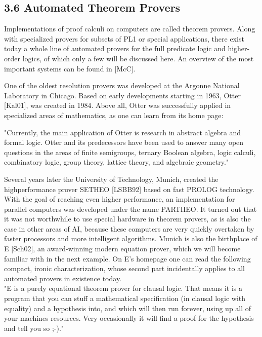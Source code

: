 \documentclass[10pt]{book}
\begin{document}
\subsection*{3.6 Automated Theorem Provers}
Implementations of proof calculi on computers are called theorem provers. Along with specialized provers for subsets of PL1 or special applications, there exist today a whole line of automated provers for the full predicate logic and higher-order logics, of which only a few will be discussed here. An overview of the most important systems can be found in [McC].

One of the oldest resolution provers was developed at the Argonne National Laboratory in Chicago. Based on early developments starting in 1963, Otter [Kal01], was created in 1984. Above all, Otter was successfully applied in specialized areas of mathematics, as one can learn from its home page:

\begin{displayquote}
"Currently, the main application of Otter is research in abstract algebra and formal logic. Otter and its predecessors have been used to answer many open questions in the areas of finite semigroups, ternary Boolean algebra, logic calculi, combinatory logic, group theory, lattice theory, and algebraic geometry."
\end{displayquote}

Several years later the University of Technology, Munich, created the highperformance prover SETHEO [LSBB92] based on fast PROLOG technology. With the goal of reaching even higher performance, an implementation for parallel computers was developed under the name PARTHEO. It turned out that it was not worthwhile to use special hardware in theorem provers, as is also the case in other areas of AI, because these computers are very quickly overtaken by faster processors and more intelligent algorithms. Munich is also the birthplace of E [Sch02], an award-winning modern equation prover, which we will become familiar with in the next example. On E's homepage one can read the following compact, ironic characterization, whose second part incidentally applies to all automated provers in existence today.\\
"E is a purely equational theorem prover for clausal logic. That means it is a program that you can stuff a mathematical specification (in clausal logic with equality) and a hypothesis into, and which will then run forever, using up all of your machines resources. Very occasionally it will find a proof for the hypothesis and tell you so ;-)."
\end{document}
